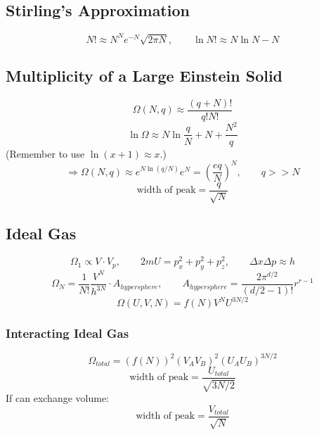 \documentclass[a4paper,norsk, 10pt]{article}
\begin{document}
\subsection{Stirling's Approximation}
\begin{equation}
N!\approx N^Ne^{-N}\sqrt{2\pi N},\qquad \ln N! \approx N\ln N - N
\end{equation}

\subsection{Multiplicity of a Large Einstein Solid}
\begin{equation}
\Omega(N,q) \approx \frac{(q+N)!}{q!N!}
\end{equation}
\begin{equation}
\ln\Omega \approx N\ln\frac{q}{N} + N + \frac{N^2}{q}
\end{equation}
(Remember to use $\ln(x+1) \approx x$.)
\begin{equation}
\Rightarrow \Omega(N,q) \approx e^{N\ln(q/N)}e^N = \left(\frac{eq}{N}\right)^N,\qquad q >>N
\end{equation}
\begin{equation}
\text{width of peak} = \frac{q}{\sqrt{N}}
\end{equation}
\subsection{Ideal Gas}
\begin{equation}
\Omega_1 \propto V\cdot V_p,\qquad 2mU = p^2_x + p^2_y + p^2_z,\qquad \Delta x \Delta p \approx h 
\end{equation}
\begin{equation}
\Omega_N = \frac{1}{N!}\frac{V^N}{h^{3N}}\cdot A_{hypersphere},\qquad A_{hypersphere} = \frac{2\pi^{d/2}}{(d/2 - 1)!}r^{r-1}
\end{equation}
\begin{equation}
\Omega(U,V,N) = f(N)V^NU^{3N/2}
\end{equation}
\subsubsection{Interacting Ideal Gas}
\begin{equation}
\Omega_{total} = (f(N))^2(V_AV_B)^2(U_AU_B)^{3N/2}
\end{equation}
\begin{equation}
\text{width of peak} = \frac{U_{total}}{\sqrt{3N/2}}
\end{equation}
If can exchange volume:
\begin{equation}
\text{width of peak} = \frac{V_{total}}{\sqrt{N}}
\end{equation}
\end{document}
